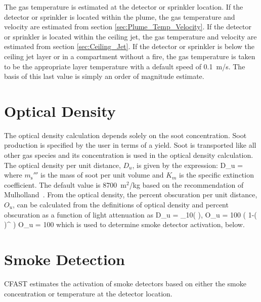 \documentclass[12pt,twoside]{book}
\begin{document}
The gas temperature is estimated at the detector or sprinkler location. If the detector or sprinkler is located within the plume, the gas temperature and velocity are estimated from section \ref{sec:Plume_Temp_Velocity}. If the detector or sprinkler is located within the ceiling jet, the gas temperature and velocity are estimated from section \ref{sec:Ceiling_Jet}.  If the detector or sprinkler is below the ceiling jet layer or in a compartment without a fire, the gas temperature is taken to be the appropriate layer temperature with a default speed of 0.1~m/s. The basis of this last value is simply an order of magnitude estimate.

\section{Optical Density}
\label{Optical_Density}
\label{Visibility}

The optical density calculation depends solely on the soot concentration. Soot production is specified by the user in terms of a yield. Soot is transported like all other gas species and its concentration is used in the optical density calculation. The optical density per unit distance, $D_u$, is given by the expression:
\be
   D_u = 
\ee
where $m_{\mathrm{s}}'''$ is the mass of soot per unit volume and $K_m$ is the specific extinction coefficient. The default value is 8700~m$^2$/kg based on the recommendation of Mulholland~\cite{Mulholland:SFPE}. From the optical density, the percent obscuration per unit distance, $O_u$, can be calculated from the definitions of optical density and percent obscuration as a function of light attenuation \cite{Schifiliti:2002} as
\be
    D_u = \log_{10}\left(  \right), O_u = 100 \left( 1-\left(  \right)^{{}} \right) \implies O_u = 100 
\ee
which is used to determine smoke detector activation, below.

\section{Smoke Detection}

CFAST estimates the activation of smoke detectors based on either the smoke concentration or temperature at the detector location.
\end{document}
